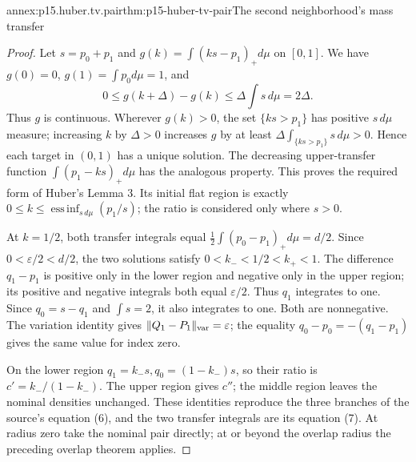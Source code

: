 \begin{annexitem}{annex:p15.huber.tv.pair}{thm:p15-huber-tv-pair}{The second neighborhood's mass transfer}
\begin{proof}
Let \(s=p_0+p_1\) and \(g(k)=\int(ks-p_1)_+d\mu\) on \([0,1]\).
We have \(g(0)=0\), \(g(1)=\int p_0d\mu=1\), and
\[
 0\leq g(k+\Delta)-g(k)\leq
             \Delta\int s\,d\mu=2\Delta .
\]
Thus \(g\) is continuous. Wherever \(g(k)>0\), the set
\(\{ks>p_1\}\) has positive \(s\,d\mu\) measure; increasing \(k\)
by \(\Delta>0\) increases \(g\) by at least
\(\Delta\int_{\{ks>p_1\}}s\,d\mu>0\).
Hence each target in \((0,1)\) has a unique solution.
The decreasing upper-transfer function
\(\int(p_1-ks)_+d\mu\) has the analogous property.
This proves the required form of Huber's Lemma 3.
Its initial flat region is exactly
\(0\leq k\leq\operatorname{ess\,inf}_{s\,d\mu}(p_1/s)\);
the ratio is considered only where \(s>0\).

At \(k=1/2\), both transfer integrals equal
\(\tfrac12\int(p_0-p_1)_+d\mu=d/2\).
Since \(0<\varepsilon/2<d/2\), the two solutions satisfy
\(0<k_-<1/2<k_+<1\).
The difference \(q_1-p_1\) is positive only in the lower region
and negative only in the upper region; its positive and negative
integrals both equal \(\varepsilon/2\).
Thus \(q_1\) integrates to one. Since \(q_0=s-q_1\) and \(\int s=2\),
it also integrates to one. Both are nonnegative.
The variation identity gives
\(\|Q_1-P_1\|_{\rm var}=\varepsilon\);
the equality \(q_0-p_0=-(q_1-p_1)\) gives the same value for index zero.

On the lower region \(q_1=k_-s,q_0=(1-k_-)s\), so their ratio is
\(c'=k_-/(1-k_-)\). The upper region gives \(c''\); the middle
region leaves the nominal densities unchanged.
These identities reproduce the three branches of the source's
equation (6), and the two transfer integrals are its equation (7).
At radius zero take the nominal pair directly; at or beyond the
overlap radius the preceding overlap theorem applies.
\end{proof}
\end{annexitem}

